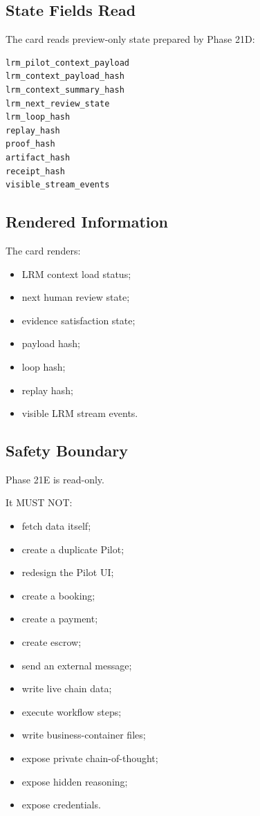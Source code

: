 \subsection{State Fields Read}

The card reads preview-only state prepared by Phase 21D:

\begin{verbatim}
lrm_pilot_context_payload
lrm_context_payload_hash
lrm_context_summary_hash
lrm_next_review_state
lrm_loop_hash
replay_hash
proof_hash
artifact_hash
receipt_hash
visible_stream_events
\end{verbatim}

\subsection{Rendered Information}

The card renders:

\begin{itemize}
  \item LRM context load status;
  \item next human review state;
  \item evidence satisfaction state;
  \item payload hash;
  \item loop hash;
  \item replay hash;
  \item visible LRM stream events.
\end{itemize}

\subsection{Safety Boundary}

Phase 21E is read-only.

It MUST NOT:

\begin{itemize}
  \item fetch data itself;
  \item create a duplicate Pilot;
  \item redesign the Pilot UI;
  \item create a booking;
  \item create a payment;
  \item create escrow;
  \item send an external message;
  \item write live chain data;
  \item execute workflow steps;
  \item write business-container files;
  \item expose private chain-of-thought;
  \item expose hidden reasoning;
  \item expose credentials.
\end{itemize}


